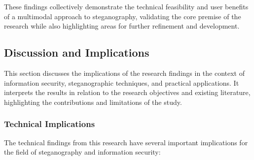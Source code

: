 \documentclass[12pt, a4paper, oneside]{book}
\begin{document}
These findings collectively demonstrate the technical feasibility and user benefits of a multimodal approach to steganography, validating the core premise of the research while also highlighting areas for further refinement and development.

\subsection{Discussion and Implications}

This section discusses the implications of the research findings in the context of information security, steganographic techniques, and practical applications. It interprets the results in relation to the research objectives and existing literature, highlighting the contributions and limitations of the study.

\subsubsection{Technical Implications}

The technical findings from this research have several important implications for the field of steganography and information security:
\end{document}
